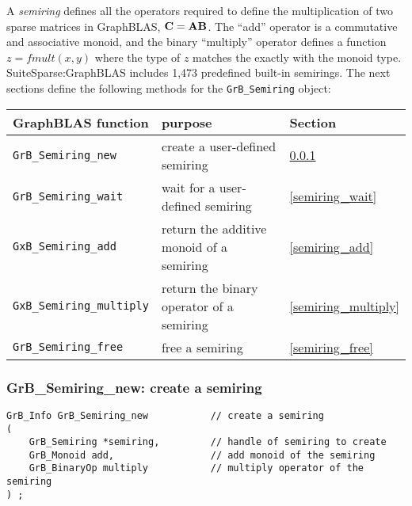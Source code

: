 \documentclass[12pt]{article}
\begin{document}
A {\em semiring} defines all the operators required to define the
multiplication of two sparse matrices in GraphBLAS, ${\bf C=AB}$.  The ``add''
operator is a commutative and associative monoid, and the binary ``multiply''
operator defines a function $z=fmult(x,y)$ where the type of $z$ matches the
exactly with the monoid type.  SuiteSparse:GraphBLAS includes 1,473 predefined
built-in semirings.  The next sections define the following methods for the
\verb'GrB_Semiring' object:

\vspace{0.2in}
{\footnotesize
\begin{tabular}{lll}
\hline
GraphBLAS function   & purpose                                      & Section \\
\hline
\verb'GrB_Semiring_new'       & create a user-defined semiring           & \ref{semiring_new} \\
\verb'GrB_Semiring_wait'      & wait for a user-defined semiring         & \ref{semiring_wait} \\
\verb'GxB_Semiring_add'       & return the additive monoid of a semiring & \ref{semiring_add} \\
\verb'GxB_Semiring_multiply'  & return the binary operator of a semiring & \ref{semiring_multiply} \\
\verb'GrB_Semiring_free'      & free a semiring                          & \ref{semiring_free} \\
\hline
\end{tabular}
}

\subsubsection{{\sf GrB\_Semiring\_new:} create a semiring}
\label{semiring_new}

\begin{mdframed}[userdefinedwidth=6in]
{\footnotesize
\begin{verbatim}
GrB_Info GrB_Semiring_new           // create a semiring
(
    GrB_Semiring *semiring,         // handle of semiring to create
    GrB_Monoid add,                 // add monoid of the semiring
    GrB_BinaryOp multiply           // multiply operator of the semiring
) ;
\end{verbatim}
} \end{mdframed}
\end{document}
